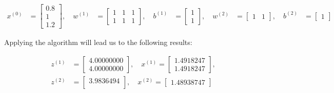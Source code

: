 \documentclass[12pt]{article}
\begin{document}
\begin{enumerate}[leftmargin=\labelsep]
        \begin{equation*}
          \begin{aligned}
            x^{(0)} & = \begin{bmatrix}
                          0.8 \\
                          1   \\
                          1.2
                        \end{bmatrix}, \quad
            w^{(1)} & = \begin{bmatrix}
                          1 & 1 & 1 \\
                          1 & 1 & 1
                        \end{bmatrix}, \quad
            b^{(1)} & = \begin{bmatrix}
                          1 \\
                          1
                        \end{bmatrix}, \quad
            w^{(2)} & = \begin{bmatrix}
                          1 & 1
                        \end{bmatrix}, \quad
            b^{(2)} & = \begin{bmatrix}
                          1
                        \end{bmatrix}
          \end{aligned}
        \end{equation*}

        Applying the algorithm will lead us to the following results:


        \begin{equation*}
          \begin{aligned}
            z^{(1)} & = \begin{bmatrix}
                          4.00000000 \\
                          4.00000000
                        \end{bmatrix}, \quad
            x^{(1)} = \begin{bmatrix}
                        1.4918247 \\
                        1.4918247
                      \end{bmatrix},         \\
            z^{(2)} & = \begin{bmatrix}
                          3.9836494 \\
                        \end{bmatrix}, \quad
            x^{(2)} = \begin{bmatrix}
                        1.48938747
                      \end{bmatrix}
          \end{aligned}
        \end{equation*}


\end{enumerate}
\end{document}
